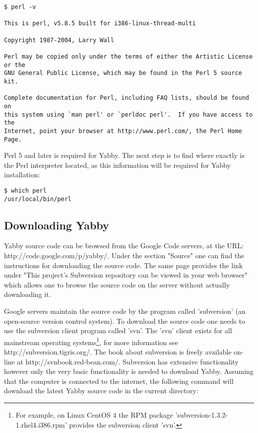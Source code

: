 \begin{verbatim}
$ perl -v

This is perl, v5.8.5 built for i386-linux-thread-multi

Copyright 1987-2004, Larry Wall

Perl may be copied only under the terms of either the Artistic License or the
GNU General Public License, which may be found in the Perl 5 source kit.

Complete documentation for Perl, including FAQ lists, should be found on
this system using `man perl' or `perldoc perl'.  If you have access to the
Internet, point your browser at http://www.perl.com/, the Perl Home Page.
\end{verbatim}

Perl 5 and later is required for Yabby.  The next step is to find where
exactly is the Perl interpreter located, as this information will be
required for Yabby installation:

\begin{verbatim}
$ which perl
/usr/local/bin/perl
\end{verbatim}

\subsection{Downloading Yabby}

Yabby source code can be browsed from the Google Code servers, at
the URL: http://code.google.com/p/yabby/. Under the
section "Source" one can find the instructions for downloading the
source code. The same page provides the link under "This project's
Subversion repository can be viewed in your web browser" which allows
one to browse the source code on the server without actually
downloading it.

Google servers maintain the source code by the program called 'subversion'
(an open-source version control system).  To download the source code
one needs to use the subversion client program called 'svn'.  The 'svn'
client exists for all mainstream operating systems\footnote{For example,
on Linux CentOS 4 the RPM package 'subversion-1.3.2-1.rhel4.i386.rpm'
provides the subversion client 'svn'.}, for more information see
http://subversion.tigris.org/.  The book about subversion is freely
available on-line at http://svnbook.red-bean.com/. Subversion has
extensive functionality however only the very basic functionality
is needed to download Yabby.  Assuming that the computer is connected
to the internet, the following command will download the latest Yabby 
source code in the current directory:


